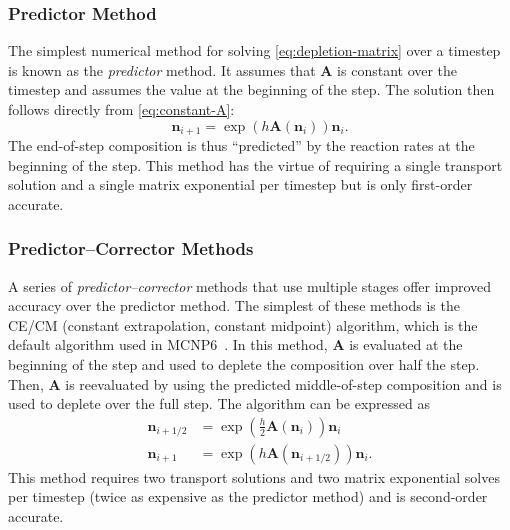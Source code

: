 \documentclass[3p,authoryear]{elsarticle}
\newcommand{\vect}[1]{\mathbf{#1}} %
\begin{document}
\subsubsection{Predictor Method}

The simplest numerical method for solving \cref{eq:depletion-matrix} over a
timestep is known as the \emph{predictor} method. It assumes that
$\vect{A}$ is constant over the timestep and assumes the value at the
beginning of the step. The solution then follows directly from
\cref{eq:constant-A}:
\begin{equation}
  \label{eq:predictor}
  \vect{n}_{i+1} = \exp\left(h\vect{A}(\vect{n}_i) \right) \vect{n}_i.
\end{equation}
The end-of-step composition is thus ``predicted'' by the reaction rates at the
beginning of the step. This method has the virtue of requiring a single
transport solution and a single matrix exponential per timestep but is only
first-order accurate.

\subsubsection{Predictor--Corrector Methods}

A series of \emph{predictor--corrector} methods that use multiple stages offer
improved accuracy over the predictor method. The simplest of these methods is
the CE/CM (constant extrapolation, constant midpoint) algorithm, which is the
default algorithm used in MCNP6~\citep{fensin2006tans}. In this method,
$\vect{A}$ is evaluated at the beginning of the step and used to deplete the
composition over half the step. Then, $\vect{A}$ is reevaluated by using the
predicted middle-of-step composition and is used to deplete over the full step.
The algorithm can be expressed as
\begin{equation}
  \begin{split}
    \vect{n}_{i+1/2} &= \exp \left (\frac{h}{2}\vect{A}(\vect{n}_i) \right) \vect{n}_i \\
    \vect{n}_{i+1} &= \exp \left(h \vect{A}(\vect{n}_{i+1/2}) \right) \vect{n}_i.
  \end{split}
\end{equation}
This method requires two transport solutions and two matrix exponential solves
per timestep (twice as expensive as the predictor method) and is second-order
accurate.
\end{document}
